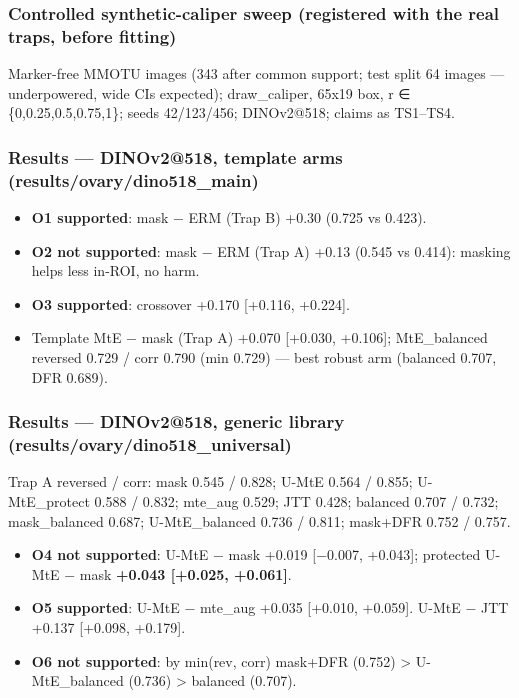 {\subsubsection{Controlled synthetic-caliper sweep (registered with the real traps, before fitting)}\label{controlled-synthetic-caliper-sweep-registered-with-the-real-traps-before-fitting}

Marker-free MMOTU images (343 after common support; test split 64 images --- underpowered, wide CIs expected);
draw\_caliper, 65x19 box, r ∈ \{0,0.25,0.5,0.75,1\}; seeds 42/123/456; DINOv2@518; claims as TS1--TS4.

\subsubsection{Results --- DINOv2@518, template arms (results/ovary/dino518\_main)}\label{results--dinov2518-template-arms-resultsovarydino518_main}

\begin{itemize}

\item
  \textbf{O1 supported}: mask − ERM (Trap B) +0.30 (0.725 vs 0.423).
\item
  \textbf{O2 not supported}: mask − ERM (Trap A) +0.13 (0.545 vs 0.414): masking helps less in-ROI, no harm.
\item
  \textbf{O3 supported}: crossover +0.170 {[}+0.116, +0.224{]}.
\item
  Template MtE − mask (Trap A) +0.070 {[}+0.030, +0.106{]}; MtE\_balanced reversed 0.729 / corr 0.790 (min 0.729) ---
  best robust arm (balanced 0.707, DFR 0.689).
\end{itemize}

\subsubsection{Results --- DINOv2@518, generic library (results/ovary/dino518\_universal)}\label{results--dinov2518-generic-library-resultsovarydino518_universal}

Trap A reversed / corr: mask 0.545 / 0.828; U-MtE 0.564 / 0.855; U-MtE\_protect 0.588 / 0.832; mte\_aug 0.529;
JTT 0.428; balanced 0.707 / 0.732; mask\_balanced 0.687; U-MtE\_balanced 0.736 / 0.811; mask+DFR 0.752 / 0.757.

\begin{itemize}

\item
  \textbf{O4 not supported}: U-MtE − mask +0.019 {[}−0.007, +0.043{]}; protected U-MtE − mask \textbf{+0.043 {[}+0.025, +0.061{]}}.
\item
  \textbf{O5 supported}: U-MtE − mte\_aug +0.035 {[}+0.010, +0.059{]}. U-MtE − JTT +0.137 {[}+0.098, +0.179{]}.
\item
  \textbf{O6 not supported}: by min(rev, corr) mask+DFR (0.752) \textgreater{} U-MtE\_balanced (0.736) \textgreater{} balanced (0.707).
\end{itemize}

}
